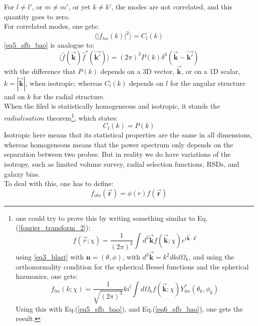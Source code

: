 For $l\ne l'$, or $m \ne m'$, or yet $k \ne k'$, the modes are not correlated, and this quantity goes to zero. \\
For correlated modes, one gets:
\begin{equation}
\langle |f_{lm}(k)|^2 \rangle = C_l(k)
\end{equation}
\ref{eq5_sfb_bao} is analogue to:
\begin{equation}
\label{eq6_sfb_bao}    
\langle \hat{f}(\vec{\textbf{k}}) \hat{f}^*(\vec{\textbf{k}'}) \rangle = (2\pi)^3 P(k) \delta^3(\vec{\textbf{k}}-\vec{\textbf{k}'})
\end{equation}
with the difference that $P(k)$ depends on a 3D vector, $\vec{\mathbf{k}}$, or on a 1D scalar, $k = |\vec{\mathbf{k}}|$, when isotropic; whereas $C_l(k)$ depends on $l$ for the angular structure and on $k$ for the radial structure. \\
When the filed is statistically homogeneous and isotropic, it stands the $radialisation$ theorem\footnote{
one could try to prove this by writing something similar to Eq. (\ref{fourier_transform_2}):
\begin{equation}
    f(\vec{r}; \chi) = \frac{1}{(2\pi)^3} \int d^3\vec{\mathbf{k}} f(\vec{\mathbf{k}};\chi) e^{i\vec{\mathbf{k}}\cdot\vec{\mathbf{r}}}
\end{equation}
using \ref{eq3_blast} with $\hat{\mathbf{n}} = (\theta, \phi)$, with $d^3\vec{\mathbf{k}} = k^2 dk d\Omega_k$, and using the orthonormality condition for the spherical Bessel functions and the spherical harmonics, one gets:
\begin{equation}
    f_{lm}(k; \chi) = \frac{1}{\sqrt{(2\pi)^3}} k i^l \int d\Omega_k f(\vec{\mathbf{k}};\chi) Y_{lm}^*(\theta_k, \phi_k)
\end{equation}
Using this with Eq.(\ref{eq5_sfb_bao}), and Eq.(\ref{eq6_sfb_bao}), one gets the result.
}, which states:
\begin{equation}
\label{eq7_sfb_bao}    
C_l(k) = P(k)
\end{equation}
Isotropic here means that its statistical properties are the same in all dimensions, whereas homogeneous means that the power spectrum only depends on the separation between two probes. But in reality we do have variations of the isotropy, such as limited volume survey, radial selection functions, RSDs, and galaxy bias. \\
To deal with this, one has to define:
\begin{equation}
\label{eq8_sfb_bao}   
    f_{obs}(\vec{\textbf{r}}) = \phi(r) f(\vec{\textbf{r}})
\end{equation}
